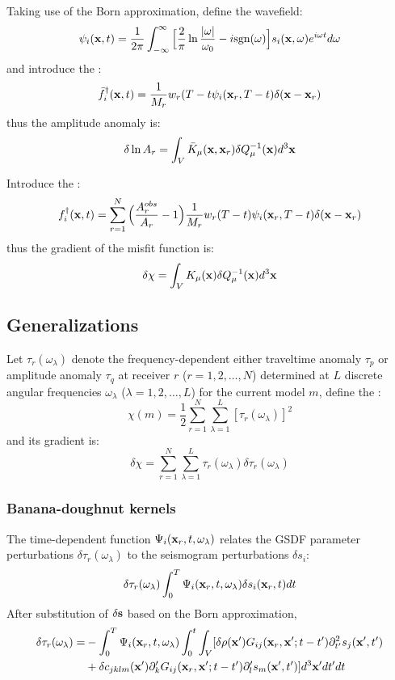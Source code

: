 Taking use of the Born approximation, define the wavefield:
\[ \psi_i(\mathbf{x},t)=\frac{1}{2\pi}\int_{-\infty}^\infty\Big[\frac{2}{\pi}\ln\frac{|\omega|}{\omega_0}-i\text{sgn}(\omega)\Big]s_i(\mathbf{x},\omega)e^{i\omega t}d\omega \]
and introduce the :
\[ \bar f_i^\dagger(\mathbf{x},t)=\frac{1}{M_r}w_r(T-t\psi_i(\mathbf{x}_r,T-t)\delta(\mathbf{x}-\mathbf{x}_r) \]
thus the amplitude anomaly is:
\[ \delta\ln A_r=\int_V\bar K_\mu(\mathbf{x},\mathbf{x}_r)\delta Q_\mu^{-1}(\mathbf{x})d^3\mathbf{x} \]

Introduce the :
\[ f_i^\dagger(\mathbf{x},t)=\sum_{r=1}^N\Big(\frac{A_r^{obs}}{A_r}-1\Big)\frac{1}{M_r}w_r(T-t)\psi_i(\mathbf{x}_r,T-t)\delta(\mathbf{x}-\mathbf{x}_r) \]
thus the gradient of the  misfit function is:
\[ \delta\chi=\int_VK_\mu(\mathbf{x})\delta Q_\mu^{-1}(\mathbf{x})d^3\mathbf{x} \]

\subsection{Generalizations}
Let $\tau_r(\omega_\lambda)$ denote the frequency-dependent
either traveltime anomaly $\tau_p$ or amplitude anomaly $\tau_q$ at receiver $r$ ($r=1,2,\ldots,N$)
determined at $L$ discrete angular frequencies $\omega_\lambda$ ($\lambda=1,2,\ldots,L$)
for the current model $m$, define the :
\[ \chi(m)=\frac{1}{2}\sum_{r=1}^N\sum_{\lambda=1}^L[\tau_r(\omega_\lambda)]^2 \]
and its gradient is:
\[ \delta\chi=\sum_{r=1}^N\sum_{\lambda=1}^L\tau_r(\omega_\lambda)\delta\tau_r(\omega_\lambda) \]

\subsubsection{Banana-doughnut kernels}
The time-dependent function $\Psi_i(\mathbf{x}_r,t,\omega_\lambda)$
relates the GSDF parameter perturbations $\delta\tau_r(\omega_\lambda)$
to the seismogram perturbations $\delta s_i$:
\[ \delta\tau_r(\omega_\lambda)\int_0^T\Psi_i(\mathbf{x}_r,t,\omega_\lambda)\delta s_i(\mathbf{x}_r,t)dt \]
After substitution of $\delta\mathbf{s}$ based on the Born approximation,
\begin{align*}
  \delta\tau_r(\omega_\lambda)= & -\int_0^T\Psi_i(\mathbf{x}_r,t,\omega_\lambda)\int_0^t\int_V[\delta\rho(\mathbf{x}')G_{ij}(\mathbf{x}_r,\mathbf{x}';t-t')\partial_{t'}^2s_j(\mathbf{x}',t') \\
    & +\delta c_{jklm}(\mathbf{x}')\partial_k^\prime G_{ij}(\mathbf{x}_r,\mathbf{x}';t-t')\partial_l^\prime s_m(\mathbf{x}',t')]d^3\mathbf{x}'dt'dt
\end{align*}

